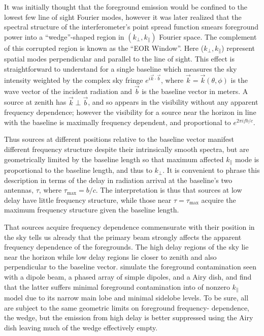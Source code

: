 \documentclass[preprint]{aastex}
\begin{document}
It was initially thought that the foreground emission would be confined to the lowest few 
line of sight Fourier modes, however it was later realized that the spectral structure of the 
interferometer's point spread function smears foreground power into a ``wedge''-shaped 
region in  $(k_\perp,k_\parallel)$ Fourier space. The complement of this corrupted region 
is known as the ``EOR Window''. Here ($k_\perp,k_\parallel$) represent spatial modes 
perpendicular and parallel to the line of sight. This effect is straightforward to understand 
for a single baseline which measures the sky intensity weighted by the complex sky fringe 
$e^{i \vec{k}\cdot\vec{b}}$, where $\vec{k}=\vec{k}(\theta,\phi)$ is the wave vector of 
the incident radiation and $\vec{b}$ is the baseline vector in meters. A source at zenith 
has $\vec{k}\perp\vec{b}$, and so appears in the visibility without any apparent 
frequency dependence; however the visibility for a source near the horizon in line with the 
baseline is maximally frequency dependent, and proportional to $e^{2\pi i f b/c}$. 

Thus sources at different positions relative to the baseline vector manifest different 
frequency structure despite their intrinsically smooth spectra, but are geometrically limited 
by the baseline length so that maximum affected $k_\parallel$ mode is proportional to the 
baseline length, and thus to $k_\perp$. It is convenient to phrase this description in terms 
of the delay in radiation arrival at the baseline's two antennas, $\tau$, where $\tau_
\text{max}=b/c$. The interpretation is thus that sources at low delay have little frequency 
structure, while those near $\tau=\tau_\text{max}$ acquire the maximum frequency 
structure given the baseline length. 

That sources acquire frequency dependence commensurate with their position in the sky 
tells us already that the primary beam strongly affects the apparent frequency dependence 
of the foregrounds. The high delay regions of the sky lie near the horizon while low delay 
regions lie closer to zenith and also perpendicular to the baseline vector. \citet{nithya15} 
simulate the foreground contamination seen with a dipole beam, a phased array of simple 
dipoles, and a Airy dish, and find that the latter suffers minimal foreground contamination 
into of nonzero $k_\parallel$ model due to its narrow main lobe and minimal sidelobe 
levels. To be sure, all are subject to the same geometric limits on foreground frequency-
dependence, the wedge, but the emission from high delay is better suppressed using the 
Airy dish leaving much of the wedge effectively empty. 
\end{document}
